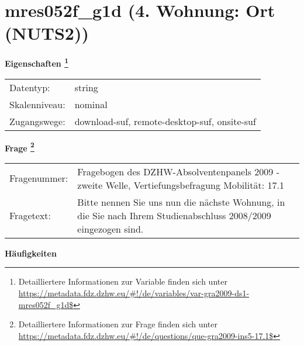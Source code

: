 
    \setcounter{footnote}{0}

    \vspace*{-1.8cm}
	\section{mres052f\_g1d (4. Wohnung: Ort (NUTS2))}
	\label{section:mres052f_g1d}



    \vspace*{0.5cm}
    \noindent\textbf{Eigenschaften
	\footnote{Detailliertere Informationen zur Variable finden sich unter
		\url{https://metadata.fdz.dzhw.eu/\#!/de/variables/var-gra2009-ds1-mres052f_g1d$}}}\\
	\begin{tabularx}{\hsize}{@{}lX}
	Datentyp: & string \\
	Skalenniveau: & nominal \\
	Zugangswege: &
	  download-suf, 
	  remote-desktop-suf, 
	  onsite-suf
 \\
    \end{tabularx}



				\vspace*{0.5cm}
                \noindent\textbf{Frage
	                \footnote{Detailliertere Informationen zur Frage finden sich unter
		              \url{https://metadata.fdz.dzhw.eu/\#!/de/questions/que-gra2009-ins5-17.1$}}}\\
				\begin{tabularx}{\hsize}{@{}lX}
					Fragenummer: &
					  Fragebogen des DZHW-Absolventenpanels 2009 - zweite Welle, Vertiefungsbefragung Mobilität:
					  17.1
 \\
					Fragetext: & Bitte nennen Sie uns nun die nächste Wohnung, in die Sie nach Ihrem Studienabschluss 2008/2009 eingezogen sind. \\
				\end{tabularx}





        		\vspace*{0.5cm}
                \noindent\textbf{Häufigkeiten}


